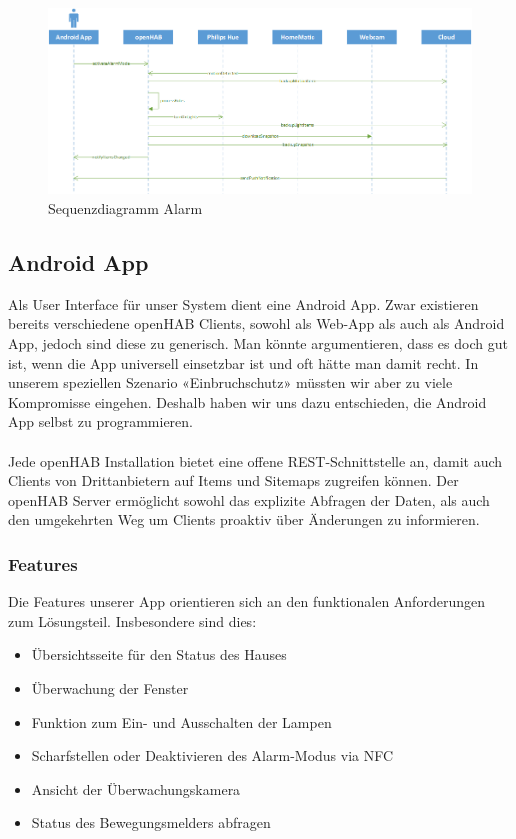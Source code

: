 \begin{figure}[H]
	\centering
		\includegraphics[width=\textwidth]{report/img/sequence_alarm.png}
	\caption{Sequenzdiagramm Alarm}
	\label{fig:sequenceAlarm}
\end{figure}


\subsection{Android App}
Als User Interface für unser System dient eine Android App. Zwar existieren bereits verschiedene openHAB Clients, sowohl als Web-App als auch als Android App, jedoch sind diese zu generisch. Man könnte argumentieren, dass es doch gut ist, wenn die App universell einsetzbar ist und oft hätte man damit recht. In unserem speziellen Szenario «Einbruchschutz» müssten wir aber zu viele Kompromisse eingehen. Deshalb haben wir uns dazu entschieden, die Android App selbst zu programmieren. 
\\ \\
Jede openHAB Installation bietet eine offene REST-Schnittstelle an, damit auch Clients von Drittanbietern auf Items und Sitemaps zugreifen können. Der openHAB Server ermöglicht sowohl das explizite Abfragen der Daten, als auch den umgekehrten Weg um Clients proaktiv über Änderungen zu informieren. 

\subsubsection{Features}
Die Features unserer App orientieren sich an den funktionalen Anforderungen zum Lösungsteil. Insbesondere sind dies:

\begin{itemize}
	\item Übersichtsseite für den Status des Hauses
	\item Überwachung der Fenster
	\item Funktion zum Ein- und Ausschalten der Lampen
	\item Scharfstellen oder Deaktivieren des Alarm-Modus via NFC
	\item Ansicht der Überwachungskamera
	\item Status des Bewegungsmelders abfragen
\end{itemize}


